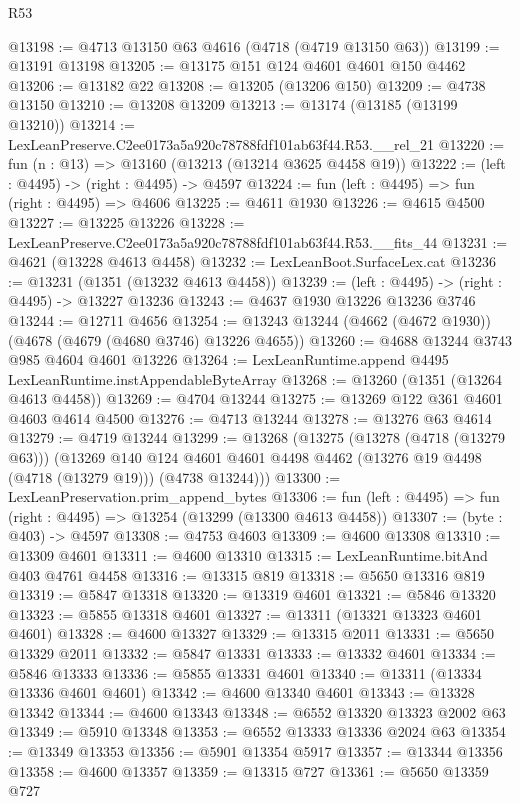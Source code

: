 \begin{lexlean}{R53}
\begin{coremodule}
@13198 := @4713 @13150 @63 @4616 (@4718 (@4719 @13150 @63))
@13199 := @13191 @13198
@13205 := @13175 @151 @124 @4601 @4601 @150 @4462
@13206 := @13182 @22
@13208 := @13205 (@13206 @150)
@13209 := @4738 @13150
@13210 := @13208 @13209
@13213 := @13174 (@13185 (@13199 @13210))
@13214 := LexLeanPreserve.C2ee0173a5a920c78788fdf101ab63f44.R53.__rel_21
@13220 := fun (n : @13) => @13160 (@13213 (@13214 @3625 @4458 @19))
@13222 := (left : @4495) -> (right : @4495) -> @4597
@13224 := fun (left : @4495) => fun (right : @4495) => @4606
@13225 := @4611 @1930
@13226 := @4615 @4500
@13227 := @13225 @13226
@13228 := LexLeanPreserve.C2ee0173a5a920c78788fdf101ab63f44.R53.__fits_44
@13231 := @4621 (@13228 @4613 @4458)
@13232 := LexLeanBoot.SurfaceLex.cat
@13236 := @13231 (@1351 (@13232 @4613 @4458))
@13239 := (left : @4495) -> (right : @4495) -> @13227 @13236
@13243 := @4637 @1930 @13226 @13236 @3746
@13244 := @12711 @4656
@13254 := @13243 @13244 (@4662 (@4672 @1930)) (@4678 (@4679 (@4680 @3746) @13226 @4655))
@13260 := @4688 @13244 @3743 @985 @4604 @4601 @13226
@13264 := LexLeanRuntime.append @4495 LexLeanRuntime.instAppendableByteArray
@13268 := @13260 (@1351 (@13264 @4613 @4458))
@13269 := @4704 @13244
@13275 := @13269 @122 @361 @4601 @4603 @4614 @4500
@13276 := @4713 @13244
@13278 := @13276 @63 @4614
@13279 := @4719 @13244
@13299 := @13268
    (@13275
      (@13278 (@4718 (@13279 @63)))
      (@13269
        @140
        @124
        @4601
        @4601
        @4498
        @4462
        (@13276 @19 @4498 (@4718 (@13279 @19)))
        (@4738 @13244)))
@13300 := LexLeanPreservation.prim_append_bytes
@13306 := fun (left : @4495) => fun (right : @4495) => @13254 (@13299 (@13300 @4613 @4458))
@13307 := (byte : @403) -> @4597
@13308 := @4753 @4603
@13309 := @4600 @13308
@13310 := @13309 @4601
@13311 := @4600 @13310
@13315 := LexLeanRuntime.bitAnd @403 @4761 @4458
@13316 := @13315 @819
@13318 := @5650 @13316 @819
@13319 := @5847 @13318
@13320 := @13319 @4601
@13321 := @5846 @13320
@13323 := @5855 @13318 @4601
@13327 := @13311 (@13321 @13323 @4601 @4601)
@13328 := @4600 @13327
@13329 := @13315 @2011
@13331 := @5650 @13329 @2011
@13332 := @5847 @13331
@13333 := @13332 @4601
@13334 := @5846 @13333
@13336 := @5855 @13331 @4601
@13340 := @13311 (@13334 @13336 @4601 @4601)
@13342 := @4600 @13340 @4601
@13343 := @13328 @13342
@13344 := @4600 @13343
@13348 := @6552 @13320 @13323 @2002 @63
@13349 := @5910 @13348
@13353 := @6552 @13333 @13336 @2024 @63
@13354 := @13349 @13353
@13356 := @5901 @13354 @5917
@13357 := @13344 @13356
@13358 := @4600 @13357
@13359 := @13315 @727
@13361 := @5650 @13359 @727

\end{coremodule}
\end{lexlean}
